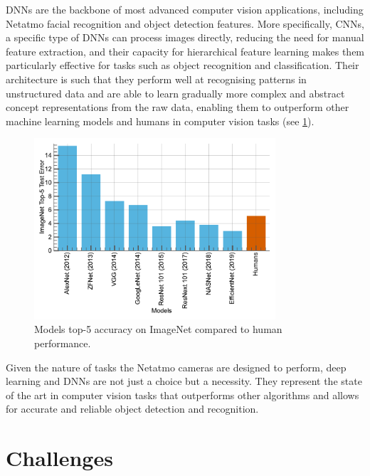 \acp{DNN} are the backbone of most advanced computer vision applications,
including Netatmo facial recognition and object detection features. More
specifically, \acp{CNN}, a specific type of \acp{DNN} can process images
directly, reducing the need for manual feature extraction, and their capacity
for hierarchical feature learning makes them particularly effective for tasks
such as object recognition and classification. Their architecture is such that
they perform well at recognising patterns in unstructured data and are able to
learn gradually more complex and abstract concept representations from the raw
data, enabling them to outperform other machine learning models and humans in
computer vision tasks (see \cref{fig:intro:models_vs_humans}).\\

\begin{figure}[htbp]
      \centering
      \includegraphics[width=0.8\textwidth]{chapter_intro/assets/models_vs_human.pdf}
      \caption{Models top-5 accuracy on ImageNet \cite{deng2009imagenet} compared
            to human performance.}
      \label{fig:intro:models_vs_humans}
\end{figure}

Given the nature of tasks the Netatmo cameras are designed to perform, deep
learning and \aclp{DNN} are not just a choice but a necessity. They represent
the state of the art in computer vision tasks that outperforms other algorithms
and allows for accurate and reliable object detection and recognition.\\

\section{Challenges}


